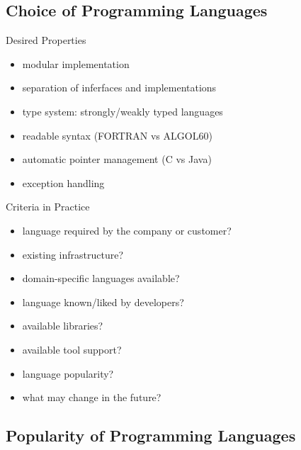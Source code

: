 \subsection{Choice of Programming Languages}
\begin{frame}{\insertsubsection}
	\begin{fancycolumns}
		\begin{definition}{{Desired Properties\mysource{\ludewiglichter}}}
			\begin{itemize}
				\item modular implementation
				\item separation of inferfaces and implementations
				\item type system: strongly/weakly typed languages
				\item readable syntax (FORTRAN vs ALGOL60) %
				\item automatic pointer management (C vs Java)
				\item exception handling
			\end{itemize}
		\end{definition}
	\nextcolumn
		\begin{example}{Criteria in Practice}
			\begin{itemize}
				\item language required by the company or customer?
				\item existing infrastructure?
				\item domain-specific languages available?
				\item language known/liked by developers?
				\item available libraries?
				\item available tool support?
				\item language popularity?
				\item what may change in the future?
			\end{itemize}
		\end{example}
	\end{fancycolumns}
\end{frame}

\subsection{Popularity of Programming Languages}
\begin{frame}[b]{\insertsubsection}
\end{frame}
\begin{frame}{\insertsubsection}
	\centering{}
\end{frame}

